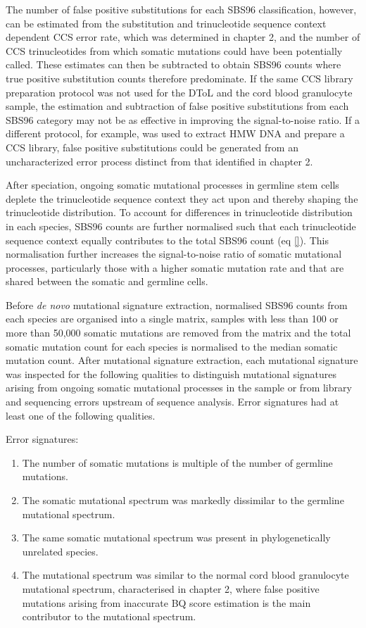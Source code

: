 The number of false positive substitutions for each SBS96 classification, however, can be estimated from the substitution and trinucleotide sequence context dependent CCS error rate, which was determined in chapter 2, and the number of CCS trinucleotides from which somatic mutations could have been potentially called. These estimates can then be subtracted to obtain SBS96 counts where true positive substitution counts therefore predominate. If the same CCS library preparation protocol was not used for the DToL and the cord blood granulocyte sample, the estimation and subtraction of false positive substitutions from each SBS96 category may not be as effective in improving the signal-to-noise ratio. If a different protocol, for example, was used to extract HMW DNA and prepare a CCS library, false positive substitutions could be generated from an uncharacterized error process distinct from that identified in chapter 2.

After speciation, ongoing somatic mutational processes in germline stem cells deplete the trinucleotide sequence context they act upon and thereby shaping the trinucleotide distribution. To account for differences in trinucleotide distribution in each species, SBS96 counts are further normalised such that each trinucleotide sequence context equally contributes to the total SBS96 count (eq \ref{}). This normalisation further increases the signal-to-noise ratio of somatic mutational processes, particularly those with a higher somatic mutation rate and that are shared between the somatic and germline cells. 

Before \textit{de novo} mutational signature extraction, normalised SBS96 counts from each species are organised into a single matrix, samples with less than 100 or more than 50,000 somatic mutations are removed from the matrix and the total somatic mutation count for each species is normalised to the median somatic mutation count. After mutational signature extraction, each mutational signature was inspected for the following qualities to distinguish mutational signatures arising from ongoing somatic mutational processes in the sample or from library and sequencing errors upstream of sequence analysis. Error signatures had at least one of the following qualities. 

\begin{description}
    \item[Error signatures:]
\end{description}
\begin{enumerate}
  \item The number of somatic mutations is multiple of the number of germline mutations. 
  \item The somatic mutational spectrum was markedly dissimilar to the germline mutational spectrum. 
\item The same somatic mutational spectrum was present in phylogenetically unrelated species.
\item The mutational spectrum was similar to the normal cord blood granulocyte mutational spectrum, characterised in chapter 2, where false positive mutations arising from inaccurate BQ score estimation is the main contributor to the mutational spectrum. 
\end{enumerate}

